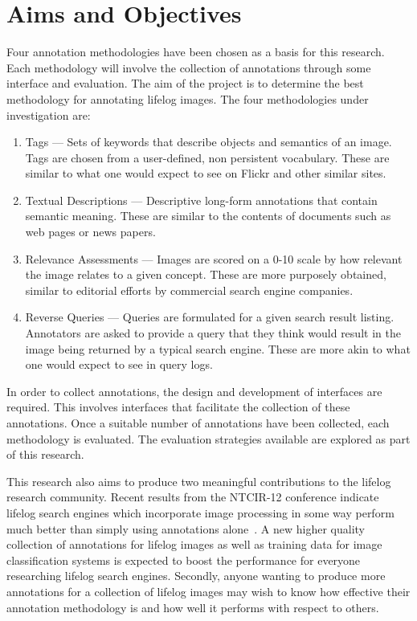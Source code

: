 \section{Aims and Objectives}

Four annotation methodologies have been chosen as a basis for this research. Each methodology will involve the collection of annotations through some interface and evaluation. The aim of the project is to determine the best methodology for annotating lifelog images. The four methodologies under investigation are: 

\begin{enumerate}
    \item Tags --- Sets of keywords that describe objects and semantics of an image. Tags are chosen from a user-defined, non persistent vocabulary. These are similar to what one would expect to see on Flickr and other similar sites.
    \item Textual Descriptions --- Descriptive long-form annotations that contain semantic meaning. These are similar to the contents of documents such as web pages or news papers.
    \item Relevance Assessments --- Images are scored on a 0-10 scale by how relevant the image relates to a given concept. These are more purposely obtained, similar to editorial efforts by commercial search engine companies.
    \item Reverse Queries --- Queries are formulated for a given search result listing. Annotators are asked to provide a query that they think would result in the image being returned by a typical search engine. These are more akin to what one would expect to see in query logs.
\end{enumerate}

In order to collect annotations, the design and development of interfaces are required. This involves interfaces that facilitate the collection of these annotations. Once a suitable number of annotations have been collected, each methodology is evaluated. The evaluation strategies available are explored as part of this research.

This research also aims to produce two meaningful contributions to the lifelog research community. Recent results from the NTCIR-12 conference indicate lifelog search engines which incorporate image processing in some way perform much better than simply using annotations alone~\cite{safadilig2016ligmrim}. A new higher quality collection of annotations for lifelog images as well as training data for image classification systems is expected to boost the performance for everyone researching lifelog search engines. Secondly, anyone wanting to produce more annotations for a collection of lifelog images may wish to know how effective their annotation methodology is and how well it performs with respect to others.

